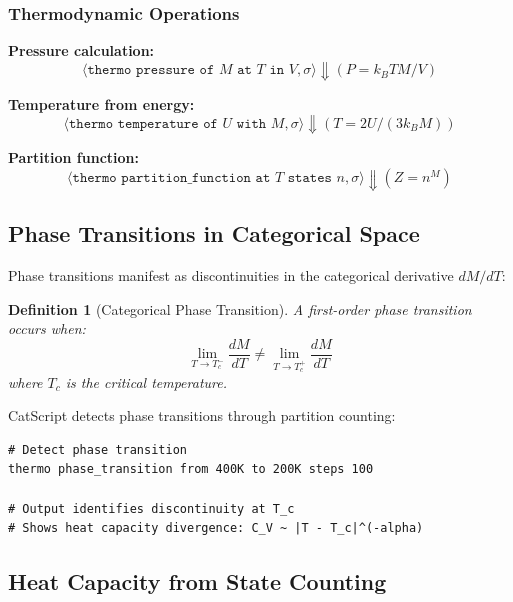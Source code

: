 \documentclass[twocolumn,10pt]{article}
\newtheorem{definition}[theorem]{Definition}
\begin{document}
\subsubsection{Thermodynamic Operations}

\textbf{Pressure calculation:}
\begin{equation}
\langle \texttt{thermo pressure of } M \texttt{ at } T \texttt{ in } V, \sigma \rangle \Downarrow (P = k_B T M/V)
\end{equation}

\textbf{Temperature from energy:}
\begin{equation}
\langle \texttt{thermo temperature of } U \texttt{ with } M, \sigma \rangle \Downarrow (T = 2U/(3k_B M))
\end{equation}

\textbf{Partition function:}
\begin{equation}
\langle \texttt{thermo partition\_function at } T \texttt{ states } n, \sigma \rangle \Downarrow (Z = n^M)
\end{equation}

\subsection{Phase Transitions in Categorical Space}

Phase transitions manifest as discontinuities in the categorical derivative $dM/dT$:

\begin{definition}[Categorical Phase Transition]
A first-order phase transition occurs when:
\begin{equation}
\lim_{T \to T_c^-} \frac{dM}{dT} \neq \lim_{T \to T_c^+} \frac{dM}{dT}
\end{equation}
where $T_c$ is the critical temperature.
\end{definition}

CatScript detects phase transitions through partition counting:

\begin{lstlisting}
# Detect phase transition
thermo phase_transition from 400K to 200K steps 100

# Output identifies discontinuity at T_c
# Shows heat capacity divergence: C_V ~ |T - T_c|^(-alpha)
\end{lstlisting}

\subsection{Heat Capacity from State Counting}
\end{document}

